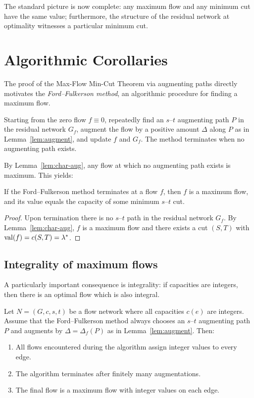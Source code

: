 \documentclass[11pt]{article}
\begin{document}
The standard picture is now complete: any maximum flow and any minimum cut
have the same value; furthermore, the structure of the residual network at
optimality witnesses a particular minimum cut.

\section{Algorithmic Corollaries}

The proof of the Max-Flow Min-Cut Theorem via augmenting paths directly
motivates the \emph{Ford--Fulkerson method}, an algorithmic procedure for
finding a maximum flow.

\begin{definition}
Starting from the zero flow $f\equiv 0$, repeatedly find an $s$--$t$ augmenting
path $P$ in the residual network $G_f$, augment the flow by a positive amount
$\Delta$ along $P$ as in Lemma~\ref{lem:augment}, and update $f$ and $G_f$.
The method terminates when no augmenting path exists.
\end{definition}

By Lemma~\ref{lem:char-aug}, any flow at which no augmenting path exists is
maximum. This yields:

\begin{corollary}\label{cor:ff-correct}
If the Ford--Fulkerson method terminates at a flow $f$, then $f$ is a maximum
flow, and its value equals the capacity of some minimum $s$--$t$ cut.
\end{corollary}

\begin{proof}
Upon termination there is no $s$--$t$ path in the residual network $G_f$.
By Lemma~\ref{lem:char-aug}, $f$ is a maximum flow and there exists a cut
$(S,T)$ with $\mathrm{val}(f)=c(S,T)=\lambda^*$.
\end{proof}

\subsection{Integrality of maximum flows}

A particularly important consequence is integrality: if capacities are
integers, then there is an optimal flow which is also integral.

\begin{theorem}\label{thm:integrality}
Let $N=(G,c,s,t)$ be a flow network where all capacities $c(e)$ are integers.
Assume that the Ford--Fulkerson method always chooses an $s$--$t$ augmenting
path $P$ and augments by $\Delta = \Delta_f(P)$ as in
Lemma~\ref{lem:augment}. Then:
\begin{enumerate}[label=(\alph*), itemsep=0.2em]
  \item All flows encountered during the algorithm assign integer values to
  every edge.
  \item The algorithm terminates after finitely many augmentations.
  \item The final flow is a maximum flow with integer values on each edge.
\end{enumerate}
\end{theorem}
\end{document}
